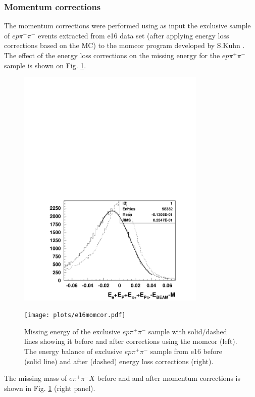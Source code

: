 \documentclass[11pt,a4paper]{article}
\begin{document}
\subsubsection{Momentum corrections}
The momentum corrections were performed using as input the exclusive sample
of  $ep\pi^+\pi^-$ events extracted from e16 data set (after applying energy
loss corrections based on the MC) to the momcor program developed by S.Kuhn \cite{Kuhn:e6}.
The effect of the energy loss corrections on the missing energy for the 
$ep\pi^+\pi^-$ sample is shown on Fig. \ref{fig:e16energybalance}.
\begin{figure}
\begin{minipage}{.6\textwidth}
\includegraphics[width=9cm]{plots/e16energybalance.pdf}
\end{minipage}
\begin{minipage}{.6\textwidth}
\texttt{[image: plots/e16momcor.pdf]}
\end{minipage}
   \caption{Missing energy of the exclusive $ep\pi^+\pi^-$
     sample  with solid/dashed lines showing it before and after corrections using the momcor \cite{Kuhn:e6} (left). The energy balance of exclusive $ep\pi^+\pi^-$
sample from e16 before (solid line) and after (dashed) energy loss corrections (right).}
 \label{fig:e16energybalance}
 \end{figure} 
The missing mass of  $e\pi^+\pi^-X$ before and and after
momentum corrections is shown in Fig. \ref{fig:e16energybalance} (right panel). 
\end{document}
